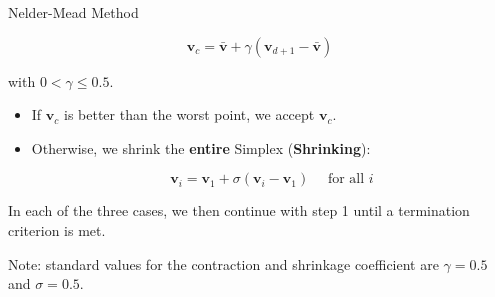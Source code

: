 \documentclass[11pt,compress,t,notes=noshow, xcolor=table]{beamer}
\begin{document}
\begin{vbframe}{Nelder-Mead Method}
\begin{enumerate}
\begin{itemize}
$$
\mathbf{v}_c = \bar{\mathbf{v}} + \gamma (\mathbf{v}_{d + 1} - \bar{\mathbf{v}})
$$

with $0 < \gamma \le 0.5$.
\begin{itemize}
\item If $\mathbf{v}_c$ is better than the worst point, we accept $\mathbf{v}_c$.
\item Otherwise, we shrink the \textbf{entire} Simplex (\textbf{Shrinking}):

$$
\mathbf{v}_{i} = \mathbf{v}_1 + \sigma (\mathbf{v}_{i} - \mathbf{v}_{1}) \quad \text{ for all } i
$$
\end{itemize}
\end{itemize}

In each of the three cases, we then continue with step 1 until a termination criterion is met.

\end{enumerate}

Note: standard values for the contraction and shrinkage coefficient are $\gamma = 0.5$ and $\sigma = 0.5$. 
\end{vbframe}





\end{document}
